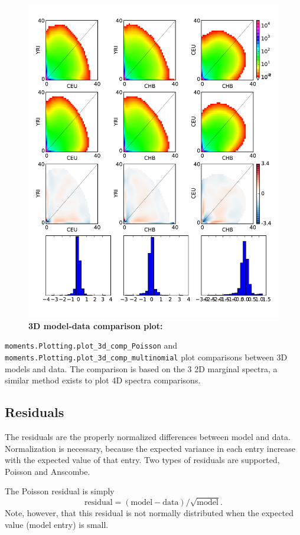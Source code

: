 \documentclass[12pt]{article}
\makeatletter
\newcommand{\py}[1]{\lstinline[breaklines=true,language=Python, showstringspaces=False]@#1@}
\makeatother
\begin{document}
\begin{figure}
\centering
\includegraphics[scale=0.5]{3d_comp}
\caption{\textbf{3D model-data comparison plot:}\label{fig:3d_comp}}
\end{figure}

\py{moments.Plotting.plot_3d_comp_Poisson} and \py{moments.Plotting.plot_3d_comp_multinomial} plot comparisons between 3D models and data.
The comparison is based on the 3 2D marginal spectra, a similar method exists to plot 4D spectra comparisons.

\subsection{Residuals}\label{sec:residuals}

The residuals are the properly normalized differences between model and data.
Normalization is necessary, because the expected variance in each entry increase with the expected value of that entry.
Two types of residuals are supported, Poisson and Anscombe.

The Poisson residual is simply
\begin{equation}
\text{residual} = (\text{model} - \text{data})/\sqrt{\text{model}}.
\end{equation}
Note, however, that this residual is not normally distributed when the expected value (model entry) is small.
\end{document}
